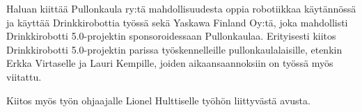 Haluan kiittää Pullonkaula ry:tä mahdollisuudesta oppia robotiikkaa käytännössä ja käyttää Drinkkirobottia työssä sekä Yaskawa Finland Oy:tä, joka mahdollisti Drinkkirobotti 5.0\hyp{}projektin sponsoroidessaan Pullonkaulaa. Erityisesti kiitos Drinkkirobotti 5.0\hyp{}projektin parissa työskennelleille pullonkaulalaisille, etenkin Erkka Virtaselle ja Lauri Kempille, joiden aikaansaannoksiin on työssä myös viitattu.

Kiitos myös työn ohjaajalle Lionel Hulttiselle työhön liittyvästä avusta.
